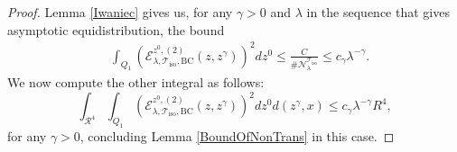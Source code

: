 \documentclass{amsart}
\theoremstyle{definition}
\theoremstyle{remark}
\renewcommand\leq\leqslant
\numberwithin{equation}{section}
\theoremstyle{definition}
\theoremstyle{remark}
\begin{document}
\begin{proof}
	Lemma \ref{Iwaniec} gives us, for any $\gamma>0$ and $\lambda$ in the sequence that gives asymptotic equidistribution, the bound	\begin{equation}
		\begin{aligned}
			&\int_{Q_1}\left(\mathcal{E}_{\lambda,\mathcal{T}_\mathrm{iso},\mathrm{BC}}^{z^0,(2)}(z,z^\gamma)\right)^2dz^0\leq\frac{C}{\#\mathcal{N}_\lambda^{\mathcal{T}_\mathrm{iso}}}\leq c_\gamma\lambda^{-\gamma}.
		\end{aligned}
	\end{equation}We now compute the other integral as follows:
	\begin{equation}
		\int_{\mathcal{R}^{4}}\int_{Q_1}\left(\mathcal{E}_{\lambda,\mathcal{T}_\mathrm{iso},\mathrm{BC}}^{z^0,(2)}(z,z^\gamma)\right)^2dz^0d(z^\gamma,x)\leq c_\gamma\lambda^{-\gamma} R^4,
	\end{equation}for any $\gamma>0$, concluding Lemma \ref{BoundOfNonTrans} in this case.
\end{proof}
\end{document}
